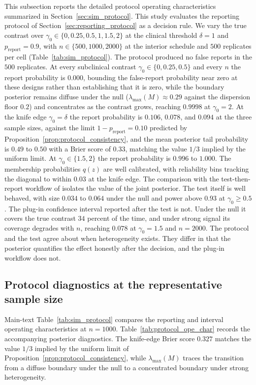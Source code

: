 \documentclass[11pt]{article}
\theoremstyle{definition}
\theoremstyle{plain}
\begin{document}
This subsection reports the detailed protocol operating characteristics summarized in Section~\ref{sec:sim_protocol}. This study evaluates the reporting protocol of Section~\ref{sec:reporting_protocol} as a decision rule. We vary the true contrast over $\gamma_0\in\{0,0.25,0.5,1,1.5,2\}$ at the clinical threshold $\delta=1$ and $p_{\mathrm{report}}=0.9$, with $n\in\{500,1000,2000\}$ at the interior schedule and $500$ replicates per cell (Table~\ref{tab:sim_protocol}). The protocol produced no false reports in the $500$ replicates. At every subclinical contrast $\gamma_0\in\{0,0.25,0.5\}$ and every $n$ the report probability is $0.000$, bounding the false-report probability near zero at these designs rather than establishing that it is zero, while the boundary posterior remains diffuse under the null ($\lambda_{\max}(M)\approx0.29$ against the dispersion floor $0.2$) and concentrates as the contrast grows, reaching $0.9998$ at $\gamma_0=2$. At the knife edge $\gamma_0=\delta$ the report probability is $0.106$, $0.078$, and $0.094$ at the three sample sizes, against the limit $1-p_{\mathrm{report}}=0.10$ predicted by Proposition~\ref{prop:protocol_consistency}, and the mean posterior tail probability is $0.49$ to $0.50$ with a Brier score of $0.33$, matching the value $1/3$ implied by the uniform limit. At $\gamma_0\in\{1.5,2\}$ the report probability is $0.996$ to $1.000$. The membership probabilities $q(z)$ are well calibrated, with reliability bins tracking the diagonal to within $0.03$ at the knife edge. The comparison with the test-then-report workflow of \citet{Fan2017} isolates the value of the joint posterior. The test itself is well behaved, with size $0.034$ to $0.064$ under the null and power above $0.93$ at $\gamma_0\ge0.5$. The plug-in confidence interval reported after the test is not. Under the null it covers the true contrast $34$ percent of the time, and under strong signal its coverage degrades with $n$, reaching $0.078$ at $\gamma_0=1.5$ and $n=2000$. The protocol and the test agree about when heterogeneity exists. They differ in that the posterior quantifies the effect honestly after the decision, and the plug-in workflow does not.

\subsection{Protocol diagnostics at the representative sample size}

Main-text Table~\ref{tab:sim_protocol} compares the reporting and interval operating characteristics at $n=1000$. Table~\ref{tab:protocol_ope_char} records the accompanying posterior diagnostics. The knife-edge Brier score $0.327$ matches the value $1/3$ implied by the uniform limit of Proposition~\ref{prop:protocol_consistency}, while $\lambda_{\max}(M)$ traces the transition from a diffuse boundary under the null to a concentrated boundary under strong heterogeneity.
\end{document}
